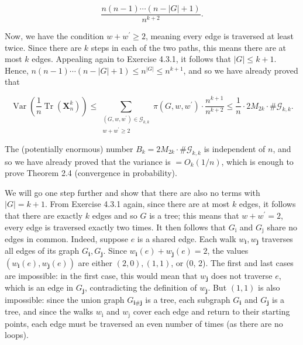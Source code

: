 \documentclass[10pt]{article}
\begin{document}
$$
\frac{n(n-1) \cdots(n-|G|+1)}{n^{k+2}} .
$$

Now, we have the condition $w+w^{\prime} \geq 2$, meaning every edge is traversed at least twice. Since there are $k$ steps in each of the two paths, this means there are at most $k$ edges. Appealing again to Exercise 4.3.1, it follows that $|G| \leq k+1$. Hence, $n(n-1) \cdots(n-|G|+1) \leq n^{|G|} \leq n^{k+1}$, and so we have already proved that

$$
\operatorname{Var}\left(\frac{1}{n} \operatorname{Tr}\left(\mathbf{X}_{n}^{k}\right)\right) \leq \sum_{\substack{\left(G, w, w^{\prime}\right) \in \mathcal{G}_{k, k} \\ w+w^{\prime} \geq 2}} \pi\left(G, w, w^{\prime}\right) \cdot \frac{n^{k+1}}{n^{k+2}} \leq \frac{1}{n} \cdot 2 M_{2 k} \cdot \# \mathcal{G}_{k, k} .
$$

The (potentially enormous) number $B_{k}=2 M_{2 k} \cdot \# \mathcal{G}_{k, k}$ is independent of $n$, and so we have already proved that the variance is $=O_{k}(1 / n)$, which is enough to prove Theorem 2.4 (convergence in probability).

We will go one step further and show that there are also no terms with $|G|=k+1$. From Exercise 4.3.1 again, since there are at most $k$ edges, it follows that there are exactly $k$ edges and so $G$ is a tree; this means that $w+w^{\prime}=2$, every edge is traversed exactly two times. It then follows that $G_{\mathrm{i}}$ and $G_{\mathrm{j}}$ share no edges in common. Indeed, suppose $e$ is a shared edge. Each walk $w_{\mathbf{i}}, w_{\mathbf{j}}$ traverses all edges of its graph $G_{\mathbf{i}}, G_{\mathbf{j}}$. Since $w_{\mathbf{i}}(e)+w_{\mathbf{j}}(e)=2$, the values $\left(w_{\mathbf{i}}(e), w_{\mathbf{j}}(e)\right)$ are either $(2,0),(1,1)$, or (0, 2). The first and last cases are impossible: in the first case, this would mean that $w_{\mathbf{j}}$ does not traverse $e$, which is an edge in $G_{\mathbf{j}}$, contradicting the definition of $w_{\mathbf{j}}$. But $(1,1)$ is also impossible: since the union graph $G_{\mathbf{i} \# \mathbf{j}}$ is a tree, each subgraph $G_{\mathbf{i}}$ and $G_{\mathbf{j}}$ is a tree, and since the walks $w_{\mathrm{i}}$ and $w_{\mathrm{j}}$ cover each edge and return to their starting points, each edge must be traversed an even number of times (as there are no loops).
\end{document}
